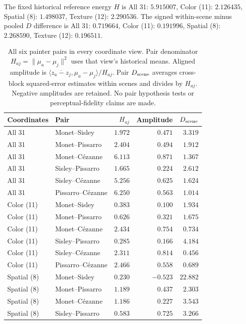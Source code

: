 The fixed historical reference energy $H$ is All 31: $5.915007$, Color (11): $2.126435$, Spatial (8): $1.498037$, Texture (12): $2.290536$.
The signed within-scene minus pooled $D$ difference is All 31: $0.719664$, Color (11): $0.191996$, Spatial (8): $2.268590$, Texture (12): $0.196511$.
\begin{table}[!htbp]
\caption{All six painter pairs in every coordinate view. Pair denominator $H_{aj}=\|\mu_a-\mu_j\|^2$ uses that view's historical means. Aligned amplitude is $\langle\overline{z_a-z_j},\mu_a-\mu_j\rangle/H_{aj}$. Pair $D_{\rm scene}$ averages cross-block squared-error estimates within scenes and divides by $H_{aj}$. Negative amplitudes are retained. No pair hypothesis tests or perceptual-fidelity claims are made.}
\label{tab:cross-cohort-pairs}
\centering\small\setlength{\tabcolsep}{4pt}
\begin{tabularx}{\linewidth}{@{}lXrrr@{}}\toprule
Coordinates & Pair & $H_{aj}$ & Amplitude & $D_{\rm scene}$\\\midrule
All 31 & Monet--Sisley & $1.972$ & $0.471$ & $3.319$\\
All 31 & Monet--Pissarro & $2.404$ & $0.494$ & $1.912$\\
All 31 & Monet--C\'ezanne & $6.113$ & $0.871$ & $1.367$\\
All 31 & Sisley--Pissarro & $1.665$ & $0.224$ & $2.612$\\
All 31 & Sisley--C\'ezanne & $5.256$ & $0.625$ & $1.624$\\
All 31 & Pissarro--C\'ezanne & $6.250$ & $0.563$ & $1.014$\\
\addlinespace[3pt]
Color (11) & Monet--Sisley & $0.383$ & $0.100$ & $1.934$\\
Color (11) & Monet--Pissarro & $0.626$ & $0.321$ & $1.675$\\
Color (11) & Monet--C\'ezanne & $2.434$ & $0.754$ & $0.734$\\
Color (11) & Sisley--Pissarro & $0.285$ & $0.166$ & $4.184$\\
Color (11) & Sisley--C\'ezanne & $2.311$ & $0.814$ & $0.456$\\
Color (11) & Pissarro--C\'ezanne & $2.466$ & $0.558$ & $0.689$\\
\addlinespace[3pt]
Spatial (8) & Monet--Sisley & $0.230$ & $-0.523$ & $22.882$\\
Spatial (8) & Monet--Pissarro & $1.189$ & $0.437$ & $2.303$\\
Spatial (8) & Monet--C\'ezanne & $1.186$ & $0.227$ & $3.543$\\
Spatial (8) & Sisley--Pissarro & $0.583$ & $0.725$ & $3.266$\\

\end{tabularx}
\end{table}

